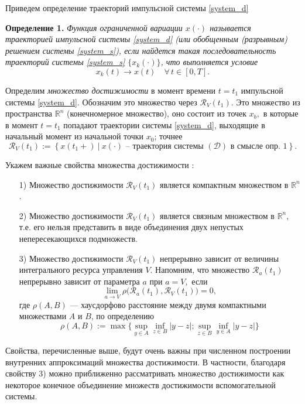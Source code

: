 Приведем определение траекторий импульсной системы \eqref{system_d}

{\bf Определение 1.}
  {\it Функция ограниченной вариации $x(\cdot)$ называется траекторией
  импульсной системы \eqref{system_d} (или обобщенным (разрывным)
  решением системы \eqref{system_s}), если найдется такая последовательность
  траекторий системы \eqref{system_s} $\bigl\{x_k(\cdot)\bigr\}$, что выполняется
  условие 
\begin{equation*}
  x_k(t)\to x(t) \quad  \forall \, t\in [0,T].
\end{equation*}}

Определим \emph{множество достижимости} в момент  времени $t=t_1$
импульсной системы \eqref{system_d}. Обозначим это множество через 
$ {\mathcal R}_V(t_1)$. Это множество из  пространства ${\mathbb R}^n$
(конечномерное  множество), оно состоит из точек $x_b,$ в  которые в
момент $t=t_1$ попадают траектории  системы \eqref{system_d}, выходящие
в начальный  момент из начальной точки $x_0$; точнее
\begin{equation*} 
  {\mathcal R}_V(t_1):=\left\{ x(t_1+) \ \big| \
    x(\cdot) \mbox{ -- траектория системы } ({\mathcal D}) \mbox{ в
      смысле опр. 1} \right\}.
\end{equation*}

Укажем важные свойства множества достижимости \cite{ZS1991, SS2010}:

\begin{itemize}
\item[ 1)] Множество достижимости ${\mathcal R}_V(t_1)$ является
компактным множеством в ${\mathbb R}^n$.
\item[ 2)] Множество достижимости ${\mathcal R}_V(t_1)$ является связным
множеством в ${\mathbb R}^n,$ т.е. его нельзя представить в виде
объединения двух непустых непересекающихся подмножеств.
\item[ 3)] Множество достижимости ${\mathcal R}_V(t_1)$ непрерывно
зависит от величины интегрального ресурса управления $V$. Напомним,
что множество ${\mathcal R}_a(t_1)$ непрерывно зависит от параметра $a$
при $a=V,$ если
\begin{equation*} 
  \lim_{a\to V} \rho\Big( {\mathcal R}_a(t_1) , {\mathcal
    R}_V(t_1) \Big) =0 ,
\end{equation*} где $\rho(A,B)$ --- хаусдорфово расстояние между двумя компактными
множествами $A$ и $B$, по определению
\begin{equation}
  \label{eq:hausd_dist}
  \rho(A,B):=\max\bigl\{ \sup\limits_{y\in
A}\inf\limits_{z\in B} |y-z| ; \sup\limits_{z\in B}\inf\limits_{y\in
A} |y-z| \bigr\}
\end{equation}
\end{itemize}

Свойства, перечисленные выше, будут очень важны при численном построении внутренних
аппроксимаций множества достижимости.  В частности, благодаря свойству 3)
можно приближенно рассматривать множество достижимости как
некоторое конечное объединение множеств достижимости вспомогательной
системы.



